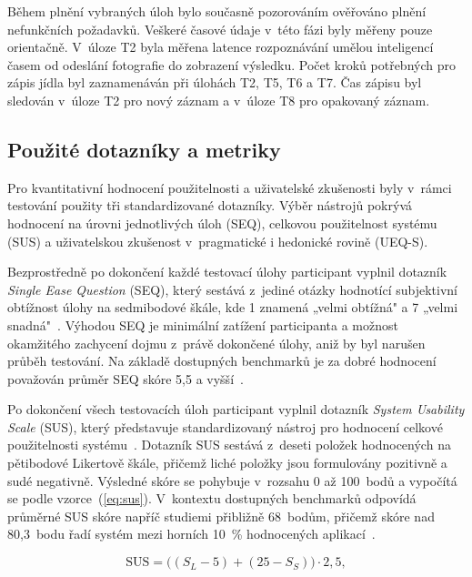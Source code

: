 Během plnění vybraných úloh bylo současně pozorováním ověřováno plnění nefunkčních požadavků.
Veškeré časové údaje v~této fázi byly měřeny pouze orientačně.
V~úloze T2 byla měřena latence rozpoznávání umělou inteligencí časem od odeslání fotografie do zobrazení výsledku.
Počet kroků potřebných pro zápis jídla byl zaznamenáván při úlohách T2, T5, T6 a T7.
Čas zápisu byl sledován v~úloze T2 pro nový záznam a v~úloze T8 pro opakovaný záznam.

\subsection{Použité dotazníky a metriky}
\label{subsec:dotazniky}

Pro kvantitativní hodnocení použitelnosti a uživatelské zkušenosti byly v~rámci testování použity tři standardizované dotazníky.
Výběr nástrojů pokrývá hodnocení na úrovni jednotlivých úloh (SEQ), celkovou použitelnost systému (SUS) a uživatelskou zkušenost v~pragmatické i hedonické rovině (UEQ-S).

Bezprostředně po dokončení každé testovací úlohy participant vyplnil dotazník \emph{Single Ease Question} (SEQ), který sestává z~jediné otázky hodnotící subjektivní obtížnost úlohy na sedmibodové škále, kde 1 znamená „velmi obtížná" a 7 „velmi snadná"~\cite{sauro2009seq}.
Výhodou SEQ je minimální zatížení participanta a možnost okamžitého zachycení dojmu z~právě dokončené úlohy, aniž by byl narušen průběh testování.
Na základě dostupných benchmarků je za dobré hodnocení považován průměr SEQ skóre 5,5 a vyšší~\cite{sauro2009seq}.

Po dokončení všech testovacích úloh participant vyplnil dotazník \emph{System Usability Scale} (SUS), který představuje standardizovaný nástroj pro hodnocení celkové použitelnosti systému~\cite{brooke1996sus}.
Dotazník SUS sestává z~deseti položek hodnocených na pětibodové Likertově škále, přičemž liché položky jsou formulovány pozitivně a sudé negativně.
Výsledné skóre se pohybuje v~rozsahu 0 až 100~bodů a vypočítá se podle vzorce~(\ref{eq:sus}).
V~kontextu dostupných benchmarků odpovídá průměrné SUS skóre napříč studiemi přibližně 68~bodům, přičemž skóre nad 80,3~bodu řadí systém mezi horních 10~\% hodnocených aplikací~\cite{bangor2008susAdjective}.

\begin{equation}
	\mathrm{SUS} = \bigl((S_L - 5) + (25 - S_S)\bigr) \cdot 2{,}5,
	\label{eq:sus}
\end{equation}

